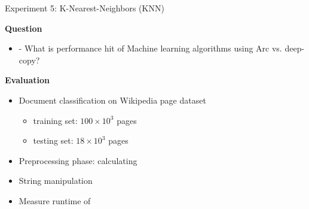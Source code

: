 \documentclass[9pt]{beamer}
\begin{document}
\begin{frame}[fragile]{Experiment 5: K-Nearest-Neighbors (KNN)}

    \textbf{Question}
    \begin{itemize}
        \item - What is performance hit of Machine learning algorithms using Arc vs. deep-copy?
    \end{itemize}

    \vspace{0.5cm}

    \textbf{Evaluation}
    \begin{itemize}
        \item Document classification on Wikipedia page dataset
        \begin{itemize}
            \item training set: \(100 \times 10^3 \) pages
            \item testing set: \(18 \times  10^3\) pages
        \end{itemize}
        \item Preprocessing phase: calculating 
        \item String manipulation
        \item Measure runtime of 
    \end{itemize}
\end{frame}

\end{document}
